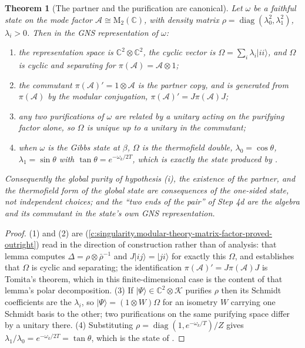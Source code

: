 \documentclass[11pt]{article}
\newtheorem{theorem}{Theorem}[section]
\theoremstyle{definition}
\theoremstyle{plain}
\providecommand{\Aa}{}\renewcommand{\Aa}{\mathcal{A}}
\providecommand{\C}{}\renewcommand{\C}{\mathbb{C}}
\providecommand{\Mat}{}\renewcommand{\Mat}{\mathrm{M}}
\begin{document}
\begin{theorem}[The partner and the purification are canonical]\label{c:state-selection.partner-purification-are-canonical}
Let $\omega$ be a faithful state on the mode factor $\Aa \cong \Mat_2(\C)$, with density matrix $\rho = \operatorname{diag}(\lambda_0^{2}, \lambda_1^{2})$, $\lambda_i > 0$. Then in the GNS representation of $\omega$:
\begin{enumerate}
\item the representation space is $\C^{2}\otimes\C^{2}$, the cyclic vector is $\Omega = \sum_i \lambda_i |ii\rangle$, and $\Omega$ is cyclic and separating for $\pi(\Aa) = \Aa \otimes 1$;
\item the commutant $\pi(\Aa)' = 1 \otimes \Aa$ is the partner copy, and is generated from $\pi(\Aa)$ by the modular conjugation, $\pi(\Aa)' = J\pi(\Aa)J$;
\item any two purifications of $\omega$ are related by a unitary acting on the purifying factor alone, so $\Omega$ is unique up to a unitary in the commutant;
\item when $\omega$ is the Gibbs state at $\beta$, $\Omega$ is the thermofield double, $\lambda_0 = \cos\theta$, $\lambda_1 = \sin\theta$ with $\tan\theta = e^{-\omega_k/2T}$, which is exactly the state produced by \cite[Lem.~7.2]{ButlerT5}.
\end{enumerate}
Consequently the global purity of hypothesis (i), the existence of the partner, and the thermofield form of the global state are consequences of the one-sided state, not independent choices; and the ``two ends of the pair'' of Step 4d are the algebra and its commutant in the state's own GNS representation.
\end{theorem}
\begin{proof}
(1) and (2) are \cite[Lem.~7.1]{ButlerT5} (\ref{c:singularity.modular-theory-matrix-factor-proved-outright}) read in the direction of construction rather than of analysis: that lemma computes $\Delta = \rho\otimes\bar\rho^{-1}$ and $J|ij\rangle = |ji\rangle$ for exactly this $\Omega$, and establishes that $\Omega$ is cyclic and separating; the identification $\pi(\Aa)' = J\pi(\Aa)J$ is Tomita's theorem, which in this finite-dimensional case is the content of that lemma's polar decomposition. (3) If $|\Psi\rangle \in \C^2\otimes\mathcal{K}$ purifies $\rho$ then its Schmidt coefficients are the $\lambda_i$, so $|\Psi\rangle = (1\otimes W)\Omega$ for an isometry $W$ carrying one Schmidt basis to the other; two purifications on the same purifying space differ by a unitary there. (4) Substituting $\rho = \operatorname{diag}(1, e^{-\omega_k/T})/Z$ gives $\lambda_1/\lambda_0 = e^{-\omega_k/2T} = \tan\theta$, which is the state of \cite[Lem.~7.2]{ButlerT5}.

\end{proof}
\end{document}
